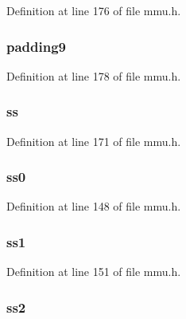 Definition at line 176 of file mmu.\-h.

\hypertarget{structtaskstate_ad623705de2c5edc604acd86510f30331}{
\subsubsection[{padding9}]{ padding9}}\label{structtaskstate_ad623705de2c5edc604acd86510f30331}


Definition at line 178 of file mmu.\-h.

\hypertarget{structtaskstate_aa518aeb56634c5237632789fbe00b635}{
\subsubsection[{ss}]{ ss}}\label{structtaskstate_aa518aeb56634c5237632789fbe00b635}


Definition at line 171 of file mmu.\-h.

\hypertarget{structtaskstate_a9648f5e19cd4adcae28d51f6e326d6f4}{
\subsubsection[{ss0}]{ ss0}}\label{structtaskstate_a9648f5e19cd4adcae28d51f6e326d6f4}


Definition at line 148 of file mmu.\-h.

\hypertarget{structtaskstate_afc8f1257b84a23a426b3b5b2794d98df}{
\subsubsection[{ss1}]{ ss1}}\label{structtaskstate_afc8f1257b84a23a426b3b5b2794d98df}


Definition at line 151 of file mmu.\-h.

\hypertarget{structtaskstate_a6a7c092edd3dde61711a7e349e4eb191}{
\subsubsection[{ss2}]{ ss2}}\label{structtaskstate_a6a7c092edd3dde61711a7e349e4eb191}


